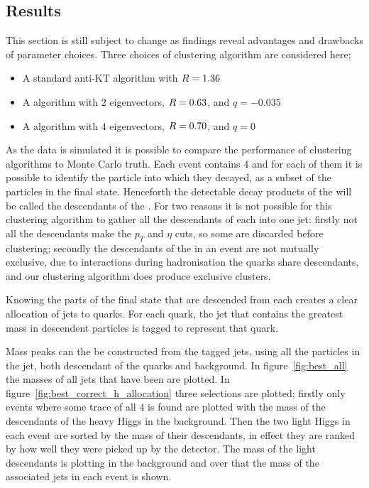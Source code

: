 \subsection{Results}
This section is still subject to change as findings reveal advantages and drawbacks
of parameter choices.
Three choices of clustering algorithm are considered here;
\begin{itemize}
    \item A standard anti-KT algorithm with \(R{}=1.36\)
    \item A \spectralfulljet{} algorithm with \(2\) eigenvectors, \(R{}=0.63\), and \(q=-0.035\)
    \item A \spectralmeanjet{} algorithm with \(4\) eigenvectors, \(R{}=0.70\), and \(q=0\)
\end{itemize}

As the data is simulated it is possible to compare the performance of clustering algorithms to Monte Carlo truth.
Each event contains 4  and for each of them it is possible to identify the particle into which they decayed, as a subset of the particles in the final state.
Henceforth the detectable decay products of the  will be called the descendants of the .
For two reasons it is not possible for this clustering algorithm to gather all the descendants
of each  into one jet:
firstly not all the descendants make the \(p_T\) and \(\eta\) cuts, so some are discarded  before clustering;
secondly the descendants of the  in an event are not mutually exclusive, due to interactions during hadronisation the quarks share descendants, and our clustering algorithm does produce exclusive clusters.

Knowing the parts of the final state that are descended from each  creates a clear
allocation of jets to quarks.
For each quark, the jet that contains the greatest mass in descendent particles is tagged to represent that quark.

Mass peaks can the be constructed from the tagged jets, using all the particles in the jet,
both descendant of the quarks and background.
In figure~\ref{fig:best_all} the masses of all jets that have been  are plotted.
In figure~\ref{fig:best_correct_h_allocation} three selections are plotted; firstly only events where some trace of all 4  is found
are plotted with the mass of the descendants of the heavy Higgs in the background.
Then the two light Higgs in each event are sorted by the mass of their descendants,
in effect they are ranked by how well they were picked up by the detector.
The mass of the light descendants is plotting in the background and over
that the mass of the associated jets in each event is shown.


